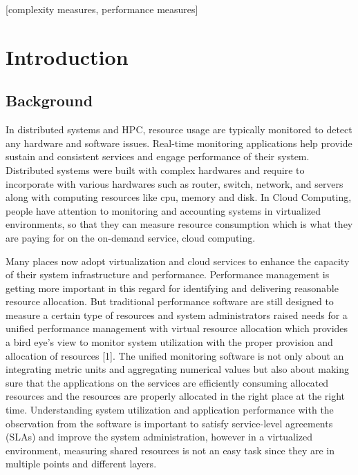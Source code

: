 \documentclass{sig-alternate}
\begin{document}
[complexity measures, performance measures] 
 
 
 
 
\section{Introduction} 

\subsection{Background}
In distributed systems and HPC, resource usage are typically monitored to detect any hardware and software issues. Real-time monitoring applications help provide sustain and consistent services and engage performance of their system. Distributed systems were built with complex hardwares and require to incorporate with various hardwares such as router, switch, network, and servers along with computing resources like cpu, memory and disk. In Cloud Computing, people have attention to monitoring and accounting systems in virtualized environments, so that they can measure resource consumption which is what they are paying for on the on-demand service, cloud computing. 

Many places now adopt virtualization and cloud services to enhance the capacity of their system infrastructure and performance. Performance management is getting more important in this regard for identifying and delivering reasonable resource allocation. But traditional performance software are still designed to measure a certain type of resources and system administrators raised needs for a unified performance management with virtual resource allocation which provides a bird eye's view to monitor system utilization with the proper provision and allocation of resources [1]. The unified monitoring software is not only about an integrating metric units and aggregating numerical values but also about making sure that the applications on the services are efficiently consuming allocated resources and the resources are properly allocated in the right place at the right time. Understanding system utilization and application performance with the observation from the software is important to satisfy service-level agreements (SLAs) and improve the system administration, however in a virtualized environment, measuring shared resources is not an easy task since they are in multiple points and different layers. 
\end{document}
